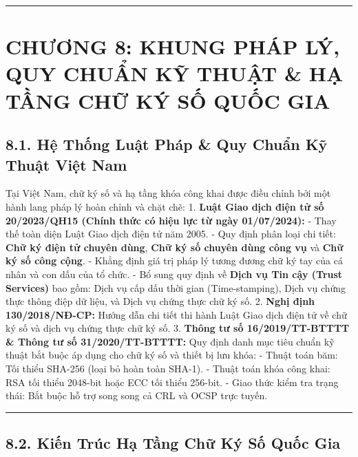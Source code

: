 \documentclass[
]{article}
\begin{document}
\begin{center}\rule{0.5\linewidth}{0.5pt}\end{center}

\section{CHƯƠNG 8: KHUNG PHÁP LÝ, QUY CHUẨN KỸ THUẬT \& HẠ TẦNG CHỮ KÝ
SỐ QUỐC
GIA}\label{chux1b0ux1a1ng-8-khung-phuxe1p-luxfd-quy-chuux1ea9n-kux1ef9-thuux1eadt-hux1ea1-tux1ea7ng-chux1eef-kuxfd-sux1ed1-quux1ed1c-gia}

\subsection{8.1. Hệ Thống Luật Pháp \& Quy Chuẩn Kỹ Thuật Việt
Nam}\label{hux1ec7-thux1ed1ng-luux1eadt-phuxe1p-quy-chuux1ea9n-kux1ef9-thuux1eadt-viux1ec7t-nam}

Tại Việt Nam, chữ ký số và hạ tầng khóa công khai được điều chỉnh bởi
một hành lang pháp lý hoàn chỉnh và chặt chẽ: 1. \textbf{Luật Giao dịch
điện tử số 20/2023/QH15 (Chính thức có hiệu lực từ ngày 01/07/2024):} -
Thay thế toàn diện Luật Giao dịch điện tử năm 2005. - Quy định phân loại
chi tiết: \textbf{Chữ ký điện tử chuyên dùng}, \textbf{Chữ ký số chuyên
dùng công vụ} và \textbf{Chữ ký số công cộng}. - Khẳng định giá trị pháp
lý tương đương chữ ký tay của cá nhân và con dấu của tổ chức. - Bổ sung
quy định về \textbf{Dịch vụ Tin cậy (Trust Services)} bao gồm: Dịch vụ
cấp dấu thời gian (Time-stamping), Dịch vụ chứng thực thông điệp dữ
liệu, và Dịch vụ chứng thực chữ ký số. 2. \textbf{Nghị định
130/2018/NĐ-CP:} Hướng dẫn chi tiết thi hành Luật Giao dịch điện tử về
chữ ký số và dịch vụ chứng thực chữ ký số. 3. \textbf{Thông tư số
16/2019/TT-BTTTT \& Thông tư số 31/2020/TT-BTTTT:} Quy định danh mục
tiêu chuẩn kỹ thuật bắt buộc áp dụng cho chữ ký số và thiết bị lưu khóa:
- Thuật toán băm: Tối thiểu SHA-256 (loại bỏ hoàn toàn SHA-1). - Thuật
toán khóa công khai: RSA tối thiểu 2048-bit hoặc ECC tối thiểu 256-bit.
- Giao thức kiểm tra trạng thái: Bắt buộc hỗ trợ song song cả CRL và
OCSP trực tuyến.

\begin{center}\rule{0.5\linewidth}{0.5pt}\end{center}

\subsection{8.2. Kiến Trúc Hạ Tầng Chữ Ký Số Quốc
Gia}\label{kiux1ebfn-truxfac-hux1ea1-tux1ea7ng-chux1eef-kuxfd-sux1ed1-quux1ed1c-gia}
\end{document}
